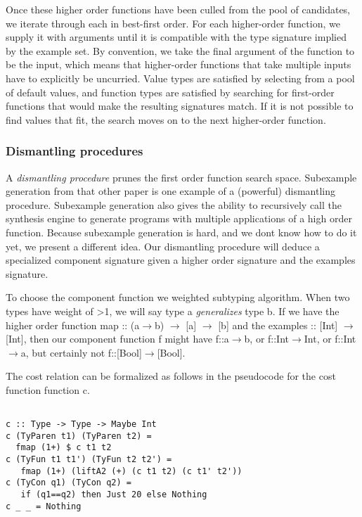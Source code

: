 Once these higher order functions have been culled from the pool of candidates, we iterate through each in best-first order. For each higher-order function, we supply it with arguments until it is compatible with the type signature implied by the example set. By convention, we take the final argument of the function to be the input, which means that higher-order functions that take multiple inputs have to explicitly be uncurried. Value types are satisfied by selecting from a pool of default values, and function types are satisfied by searching for first-order functions that would make the resulting signatures match. If it is not possible to find values that fit, the search moves on to the next higher-order function.

\subsubsection{Dismantling procedures}

A \textit{dismantling procedure} prunes the first order function search space.
Subexample generation from that other paper\cite{isil} is one example of a (powerful) dismantling procedure. Subexample generation also gives the ability to recursively call the synthesis engine to generate programs with multiple applications of a high order function.
Because subexample generation is hard, and we dont know how to do it yet, we present a different idea.
Our dismantling procedure will deduce a specialized component signature given a higher order signature and the examples signature.

To choose the component function we weighted subtyping algorithm.
When two types have weight of >1, we will say type a \textit{generalizes} type b.
If we have the higher order function map :: (a$\to$b) $\to$ [a] $\to$ [b] and the examples :: [Int] $\to$ [Int], then our component function f might have f::a$\to$b, or f::Int$\to$Int, or f::Int$\to$a, but certainly not f::[Bool]$\to$[Bool].

The cost relation can be formalized as follows in the pseudocode for the cost function function c.
\begin{lstlisting}

c :: Type -> Type -> Maybe Int
c (TyParen t1) (TyParen t2) =
  fmap (1+) $ c t1 t2
c (TyFun t1 t1') (TyFun t2 t2') =
   fmap (1+) (liftA2 (+) (c t1 t2) (c t1' t2'))
c (TyCon q1) (TyCon q2) =
   if (q1==q2) then Just 20 else Nothing
c _ _ = Nothing

\end{lstlisting}



